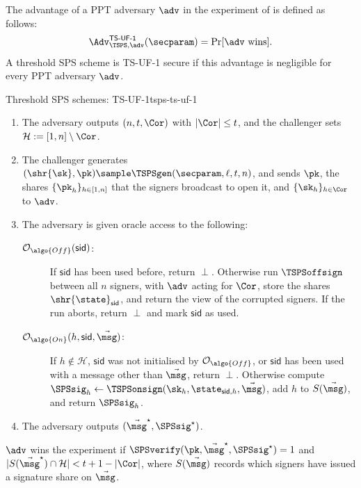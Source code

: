 The advantage of a PPT adversary $\adv$ in the experiment of
 is defined as follows:
%
\begin{equation*}
%
  \Adv_{\TSPS, \adv}^{\mathsf{TS\text{-}UF\text{-}1}}(\secparam) = \Pr[\adv\text{ wins}].
%
\end{equation*}
%
A threshold SPS scheme is TS-UF-1
secure if this advantage is negligible for every PPT adversary $\adv$.

\begin{experimentbox}{Threshold SPS schemes: TS-UF-1}{tsps-ts-uf-1}

  \begin{enumerate}

    \item The adversary outputs $(n, t, \Cor)$ with $|\Cor| \leq t$, and the
challenger sets $\mathcal{H} := [1,n] \setminus \Cor$.

    \item The challenger generates $(\shr{\sk}, \pk) \sample \TSPSgen(\secparam,
\ell, t, n)$, and sends $\pk$, the shares $\{\pk_h\}_{h \in [1,n]}$ that the
signers broadcast to open it, and $\{\sk_h\}_{h \in \Cor}$ to $\adv$.

    \item The adversary is given oracle access to the following:

      \begin{description}

	\item[$\mathcal{O}_{\algo{Off}}(\mathsf{sid})$:] If $\mathsf{sid}$ has
been used before, return $\perp$. Otherwise run $\TSPSoffsign$ between all $n$
signers, with $\adv$ acting for $\Cor$, store the shares
$\shr{\state}_{\mathsf{sid}}$, and return the view of the corrupted signers. If
the run aborts, return $\perp$ and mark $\mathsf{sid}$ as used.

	\item[$\mathcal{O}_{\algo{On}}(h, \mathsf{sid}, \vec{\msg})$:] If $h
\notin \mathcal{H}$, $\mathsf{sid}$ was not initialised by
$\mathcal{O}_{\algo{Off}}$, or $\mathsf{sid}$ has been used with a message other
than $\vec{\msg}$, return $\perp$. Otherwise compute $\SPSsig_h \leftarrow
\TSPSonsign(\sk_h, \state_{\mathsf{sid},h}, \vec{\msg})$, add $h$ to
$S(\vec{\msg})$, and return $\SPSsig_h$.

      \end{description}

    \item The adversary outputs $(\vec{\msg}^\star, \SPSsig^\star)$.

  \end{enumerate}

  $\adv$ wins the experiment if $\SPSverify(\pk, \vec{\msg}^\star, \SPSsig^\star) = 1$
and $|S(\vec{\msg}^\star) \cap \mathcal{H}| < t + 1 - |\Cor|$, where
$S(\vec{\msg})$ records which signers have issued a signature share on
$\vec{\msg}$.

\end{experimentbox}

